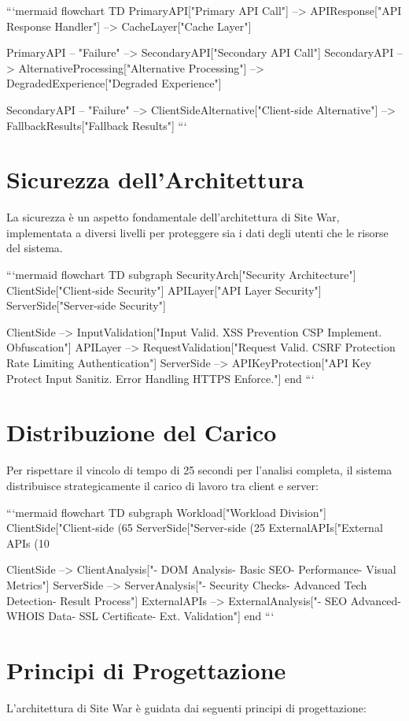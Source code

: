 ```mermaid
flowchart TD
    PrimaryAPI["Primary API Call"] --> APIResponse["API Response Handler"] --> CacheLayer["Cache Layer"]
    
    PrimaryAPI -- "Failure" --> SecondaryAPI["Secondary API Call"]
    SecondaryAPI --> AlternativeProcessing["Alternative Processing"] --> DegradedExperience["Degraded Experience"]
    
    SecondaryAPI -- "Failure" --> ClientSideAlternative["Client-side Alternative"] --> FallbackResults["Fallback Results"]
```

\section{Sicurezza dell'Architettura}
La sicurezza è un aspetto fondamentale dell'architettura di Site War, implementata a diversi livelli per proteggere sia i dati degli utenti che le risorse del sistema.

```mermaid
flowchart TD
    subgraph SecurityArch["Security Architecture"]
        ClientSide["Client-side Security"] 
        APILayer["API Layer Security"] 
        ServerSide["Server-side Security"]
        
        ClientSide --> InputValidation["Input Valid. XSS Prevention CSP Implement. Obfuscation"]
        APILayer --> RequestValidation["Request Valid. CSRF Protection Rate Limiting Authentication"]
        ServerSide --> APIKeyProtection["API Key Protect Input Sanitiz. Error Handling HTTPS Enforce."]
    end
```

\section{Distribuzione del Carico}
Per rispettare il vincolo di tempo di 25 secondi per l'analisi completa, il sistema distribuisce strategicamente il carico di lavoro tra client e server:

```mermaid
flowchart TD
    subgraph Workload["Workload Division"]
        ClientSide["Client-side (65%
        ServerSide["Server-side (25%
        ExternalAPIs["External APIs (10%
        
        ClientSide --> ClientAnalysis["- DOM Analysis\n- Basic SEO\n- Performance\n- Visual Metrics"]
        ServerSide --> ServerAnalysis["- Security Checks\n- Advanced Tech Detection\n- Result Process"]
        ExternalAPIs --> ExternalAnalysis["- SEO Advanced\n- WHOIS Data\n- SSL Certificate\n- Ext. Validation"]
    end
```

\section{Principi di Progettazione}
L'architettura di Site War è guidata dai seguenti principi di progettazione:

